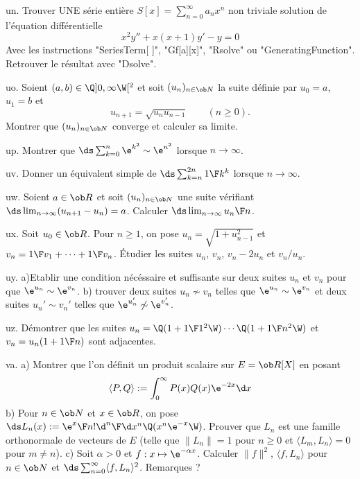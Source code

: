 \exo [Level=2,Fight=2,Learn=2,Field=\EquationsDifférentielles,Type=\Maple,Origin=] un. 
Trouver UNE série entière $S[x]=\sum_{n=0}^\infty a_nx^n$ non triviale
solution de l'équation différentielle 
$$
x^2y''+x(x+1)y'-y=0
$$
Avec les instructions "SeriesTerm[  ]", "Gf[a][x]", "Rsolve" ou "GeneratingFunction". \pn
Retrouver le résultat avec "Dsolve". 

\exo [Level=1,Fight=0,Learn=0,Type=\Exercices,Field=\Suites,Origin=] uo. 
Soient $(a,b)\in\Q]0,\infty\W[^2$ et soit $(u_n)_{n\in\ob N}$ la suite définie par $u_0=a$, $u_1=b$ et 
$$
u_{n+1}=\sqrt{u_nu_{n-1}}\qquad(n\ge0).
$$
Montrer que $(u_n)_{n\in\ob N}$ converge et calculer sa limite. 

\exo [Level=1,Fight=0,Learn=0,Type=\Exercices,Field=\DéveloppementsLimités,Origin=] up. 
Montrer que $\ds\sum_{k=0}^n\e^{k^2}\sim\e^{n^2}$ lorsque $n\to\infty$. 

\exo [Level=1,Fight=0,Learn=0,Type=\Exercices,Field=\DéveloppementsLimités,Origin=] uv. Donner un équivalent simple de $\ds\sum_{k=n}^{2n}{1\F k^k}$ lorsque $n\to\infty$. 
 
\exo [Level=1,Fight=0,Learn=0,Type=\Exercices,Field=\DéveloppementsLimités,Origin=] uw. 
Soient $a\in\ob R$ et soit $(u_n)_{n\in\ob N}$ une suite vérifiant 
$\ds\lim_{n\to\infty}(u_{n+1}-u_n)=a$. Calculer $\ds\lim_{n\to\infty}{u_n\F n}$. 

\exo [Level=2,Fight=0,Learn=0,Type=\Exercices,Field=\SériesNumériques,Origin=] ux. 
Soit $u_0\in\ob R$. Pour $n\ge1$, on pose $u_n=\sqrt{1+u_{n-1}^2}$ 
et $v_n={1\F v_1}+\cdots+{1\F v_n}$. Étudier les suites $u_n$, $v_n$, $v_n-2u_n$ et $v_n/u_n$. 

\exo [Level=1,Fight=0,Learn=0,Type=\Exercices,Field=\Suites,Origin=] uy. 
a)Etablir une condition nécéssaire et suffisante 
sur deux suites $u_n$ et $v_n$ pour que $\e^{u_n}\sim\e^{v_n}$. 
\pn
b) trouver deux suites $u_n\not\sim v_n$ telles que $\e^{u_n}\sim\e^{v_n}$ et deux suites $u_n'\sim v_n'$ 
telles que $\e^{u_n'}\not\sim\e^{v_n'}$. 

\exo [Level=1,Fight=0,Learn=0,Type=\Exercices,Field=\Suites,Origin=] uz. 
Démontrer que les suites $u_n=\Q(1+{1\F1^2}\W)\cdots\Q(1+{1\F n^2}\W)$ 
et $v_n=u_n(1+{1\F n})$ sont adjacentes. 

\exo [Level=2,Fight=2,Learn=2,Field=\Orthonormalisation,Type=\Colles,Origin=] va. 
a) Montrer que l'on définit un produit scalaire sur $E=\ob R[X]$ en posant 
$$
\langle P,Q\rangle:=\int_0^\infty P(x)Q(x)\e^{-2x}\d x
$$ 
b) Pour $n\in\ob N$ et $x\in\ob R$, on pose $\ds L_n(x):={\e^x\F n!}{\d ^n\F\d x^n}\Q(x^n\e^{-x}\W)$. 
Prouver que $L_n$ est une famille orthonormale de vecteurs de $E$ (telle que $\|L_n\|=1$ pour $n\ge0$ 
et $\langle L_m, L_n\rangle=0$ pour $m\neq n$). \pn
c) Soit $\alpha>0$ et $f:x\mapsto \e^{-\alpha x}$. Calculer $\|f\|^2$, $\langle f,L_n\rangle$ 
pour $n\in\ob N$ et $\ds\sum_{n=0}^\infty\langle f,L_n\rangle^2$. Remarques ?

